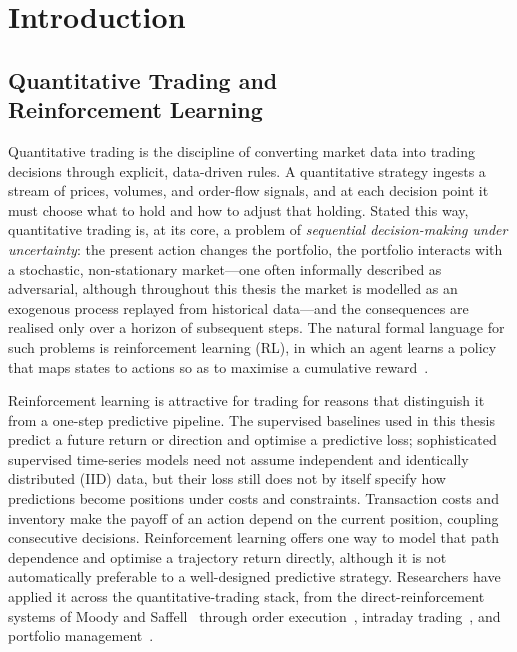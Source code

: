
\chapter{Introduction} %
\label{ch:introduction} %

\section[Quantitative Trading and Reinforcement Learning]{Quantitative Trading and\\Reinforcement Learning}
\label{sec:intro_qt_rl}

Quantitative trading is the discipline of converting market data into trading decisions through explicit, data-driven rules. A quantitative strategy ingests a stream of prices, volumes, and order-flow signals, and at each decision point it must choose what to hold and how to adjust that holding. Stated this way, quantitative trading is, at its core, a problem of \emph{sequential decision-making under uncertainty}: the present action changes the portfolio, the portfolio interacts with a stochastic, non-stationary market---one often informally described as adversarial, although throughout this thesis the market is modelled as an exogenous process replayed from historical data---and the consequences are realised only over a horizon of subsequent steps. The natural formal language for such problems is reinforcement learning (RL), in which an agent learns a policy that maps states to actions so as to maximise a cumulative reward~\cite{sutton2018reinforcement}.

Reinforcement learning is attractive for trading for reasons that distinguish it from a one-step predictive pipeline. The supervised baselines used in this thesis predict a future return or direction and optimise a predictive loss; sophisticated supervised time-series models need not assume independent and identically distributed (IID) data, but their loss still does not by itself specify how predictions become positions under costs and constraints. Transaction costs and inventory make the payoff of an action depend on the current position, coupling consecutive decisions. Reinforcement learning offers one way to model that path dependence and optimise a trajectory return directly, although it is not automatically preferable to a well-designed predictive strategy. Researchers have applied it across the quantitative-trading stack, from the direct-reinforcement systems of Moody and Saffell~\cite{moody2001learning} through order execution~\cite{nevmyvaka2006reinforcement}, intraday trading~\cite{sun2022deepscalper,briola2021deep,zhu2022quantitative}, and portfolio management~\cite{jiang2017deep}.


